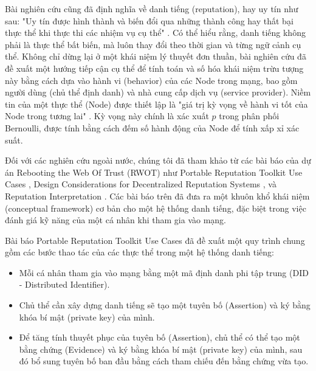 \documentclass{article}[14pt]
\begin{document}
{            Bài nghiên cứu cũng đã định nghĩa về danh tiếng (reputation), hay uy tín như sau: "Uy tín được hình thành và biến đổi qua những thành công hay thất bại thực thể khi thực thi các nhiệm vụ cụ thể" \cite{quan-ly-dinh-danh-phi-tap-trung,a-survey-of-trust-in-internet-applications}. Có thể hiểu rằng, danh tiếng không phải là thực thể bất biến, mà luôn thay đổi theo thời gian và từng ngữ cảnh cụ thể. Không chỉ dừng lại ở một khái niệm lý thuyết đơn thuần, bài nghiên cứu đã đề xuất một hướng tiếp cận cụ thể để tính toán và số hóa khái niệm trừu tượng này bằng cách dựa vào hành vi (behavior) của các Node trong mạng, bao gồm người dùng (chủ thể định danh) và nhà cung cấp dịch vụ (service provider). Niềm tin của một thực thể (Node) được thiết lập là "giá trị kỳ vọng về hành vi tốt của Node trong tương lai" \cite{quan-ly-dinh-danh-phi-tap-trung}. Kỳ vọng này chính là xác xuất \(p\) trong phân phối Bernoulli, được tính bằng cách đếm số hành động của Node để tính xấp xỉ xác suất. \cite{thong-ke-may-tinh,quan-ly-dinh-danh-phi-tap-trung} 
            \par
            Đối với các nghiên cứu ngoài nước, chúng tôi đã tham khảo từ các bài báo của dự án Rebooting the Web Of Trust (RWOT) như Portable Reputation Toolkit Use Cases \cite{reputation-toolkit}, Design Considerations for Decentralized Reputation Systems \cite{reputation-design}, và Reputation Interpretation \cite{reputation-interpretation}. Các bài báo trên đã đưa ra một khuôn khổ khái niệm (conceptual framework) cơ bản cho một hệ thống danh tiếng, đặc biệt trong việc đánh giá kỹ năng của một cá nhân khi tham gia vào mạng. 
            \par
            Bài báo Portable Reputation Toolkit Use Cases \cite{reputation-toolkit} đã đề xuất một quy trình chung gồm các bước thao tác của các thực thể trong một hệ thống danh tiếng:
            \begin{itemize}
                \item Mỗi cá nhân tham gia vào mạng bằng một mã định danh phi tập trung (DID - Distributed Identifier). 
                \item Chủ thể cần xây dựng danh tiếng sẽ tạo một tuyên bố (Assertion) và ký bằng khóa bí mật (private key) của mình. 
                \item Để tăng tính thuyết phục của tuyên bố (Assertion), chủ thể có thể tạo một bằng chứng (Evidence) và ký bằng khóa bí mật (private key) của mình, sau đó bổ sung tuyên bố ban đầu bằng cách tham chiếu đến bằng chứng vừa tạo.

\end{itemize}}
\end{document}
